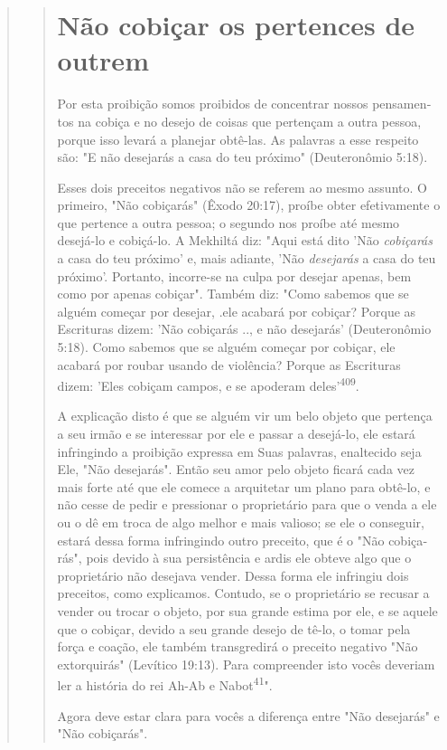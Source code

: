 \begin{quote}
\begin{quote}
\section{Não cobiçar os pertences de outrem}

Por esta proibição somos proibidos de concentrar nossos pensamen­tos na
cobiça e no desejo de coisas que pertençam a outra pessoa, porque isso
levará a planejar obtê-las. As palavras a esse respeito são: "E não
desejarás a casa do teu próximo" (Deuteronômio 5:18).

Esses dois preceitos negativos não se referem ao mesmo assunto. O
primeiro, "Não cobiçarás" (Êxodo 20:17), proíbe obter efetivamente o que
per­tence a outra pessoa; o segundo nos proíbe até mesmo desejá-lo e
cobiçá-lo. A Mekhiltá diz: "Aqui está dito 'Não \emph{cobiçarás} a casa
do teu próximo' e, mais adiante, 'Não \emph{desejarás} a casa do teu
próximo'. Portanto, incorre-se na culpa por desejar apenas, bem como por
apenas cobiçar". Também diz: "Como sa­bemos que se alguém começar por
desejar, .ele acabará por cobiçar? Porque as Escrituras dizem: 'Não
cobiçarás .., e não desejarás' (Deuteronômio 5:18). Como sabemos que se
alguém começar por cobiçar, ele acabará por roubar usan­do de violência?
Porque as Escrituras dizem: 'Eles cobiçam campos, e se apo­deram
deles'\textsuperscript{409}.

A explicação disto é que se alguém vir um belo objeto que pertença a seu
irmão e se interessar por ele e passar a desejá-lo, ele estará
infringindo a proibição expressa em Suas palavras, enaltecido seja Ele,
"Não desejarás". Então seu amor pelo objeto ficará cada vez mais forte
até que ele comece a arquitetar um plano para obtê-lo, e não cesse de
pedir e pressionar o proprietário para que o venda a ele ou o dê em
troca de algo melhor e mais valioso; se ele o conseguir, estará dessa
forma infringindo outro preceito, que é o "Não cobiça­rás", pois devido
à sua persistência e ardis ele obteve algo que o proprietário não
desejava vender. Dessa forma ele infringiu dois preceitos, como
explica­mos. Contudo, se o proprietário se recusar a vender ou trocar o
objeto, por sua grande estima por ele, e se aquele que o cobiçar, devido
a seu grande dese­jo de tê-lo, o tomar pela força e coação, ele também
transgredirá o preceito negativo "Não extorquirás" (Levítico 19:13).
Para compreender isto vocês de­veriam ler a história do rei Ah-Ab e
Nabot\textsuperscript{41}".

Agora deve estar clara para vocês a diferença entre "Não desejarás" e
"Não cobiçarás".


\end{quote}
\end{quote}
